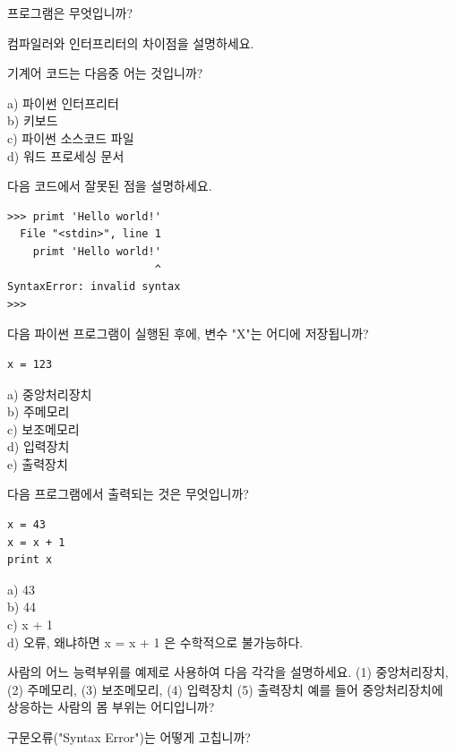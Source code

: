 \begin{ex}
프로그램은 무엇입니까?
\end{ex}

\begin{ex}
컴파일러와 인터프리터의 차이점을 설명하세요.
\end{ex}

\begin{ex}
기계어 코드는 다음중 어는 것입니까?

a) 파이썬 인터프리터\\
b) 키보드\\
c) 파이썬 소스코드 파일\\
d) 워드 프로세싱 문서
\end{ex}

\begin{ex}
 다음 코드에서 잘못된 점을 설명하세요.

\beforeverb
\begin{verbatim}
>>> primt 'Hello world!'
  File "<stdin>", line 1
    primt 'Hello world!'
                       ^
SyntaxError: invalid syntax
>>> 
\end{verbatim}
\afterverb

\end{ex}

\begin{ex}
다음 파이썬 프로그램이 실행된 후에, 변수 "X"는 어디에 저장됩니까?

\beforeverb
\begin{verbatim}
x = 123
\end{verbatim}
\afterverb
%
a) 중앙처리장치\\
b) 주메모리\\
c) 보조메모리\\
d) 입력장치\\
e) 출력장치
\end{ex}

\begin{ex}
다음 프로그램에서 출력되는 것은 무엇입니까?

\beforeverb
\begin{verbatim}
x = 43
x = x + 1
print x
\end{verbatim}
\afterverb
%
a) 43\\
b) 44\\
c) x + 1\\
d) 오류, 왜냐하면 x = x + 1 은 수학적으로 불가능하다.
\end{ex}

\begin{ex}
사람의 어느 능력부위를 예제로 사용하여 다음 각각을 설명하세요.
(1) 중앙처리장치, (2) 주메모리, (3) 보조메모리, 
(4) 입력장치
(5) 출력장치
예를 들어 중앙처리장치에 상응하는 사람의 몸 부위는 어디입니까? 
\end{ex}

\begin{ex}
구문오류("Syntax Error")는 어떻게 고칩니까?
\end{ex}

